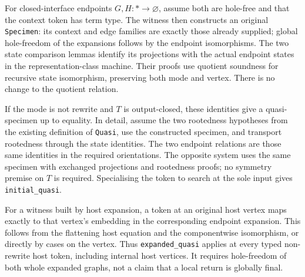 For closed-interface endpoints $G,H:*\to\varnothing$, assume both are
hole-free and that the context token has term type. The witness then constructs
an original \texttt{Specimen}: its context and edge families are exactly those
already supplied; global hole-freedom of the expansions follows by the endpoint
isomorphisms. The two state comparison lemmas identify its projections with the
actual endpoint states in the representation-class machine. Their proofs use
quotient soundness for recursive state isomorphism, preserving both mode and
vertex. There is no change to the quotient relation.


If the mode is not rewrite and $T$ is output-closed, these identities give a
quasi-specimen up to equality. In detail, assume the two rootedness hypotheses
from the existing definition of \texttt{Quasi}, use the constructed specimen,
and transport rootedness through the state identities. The two endpoint
relations are those same identities in the required orientations. The opposite
system uses the same specimen with exchanged projections and rootedness
proofs; no symmetry premise on $T$ is required. Specialising the token to
search at the sole input gives \texttt{initial\_quasi}.


For a witness built by host expansion, a token at an original host vertex maps
exactly to that vertex's embedding in the corresponding endpoint expansion.
This follows from the flattening host equation and the componentwise
isomorphism, or directly by cases on the vertex. Thus
\texttt{expanded\_quasi} applies at every typed non-rewrite host token, including
internal host vertices. It requires hole-freedom of both whole expanded graphs,
not a claim that a local return is globally final.


